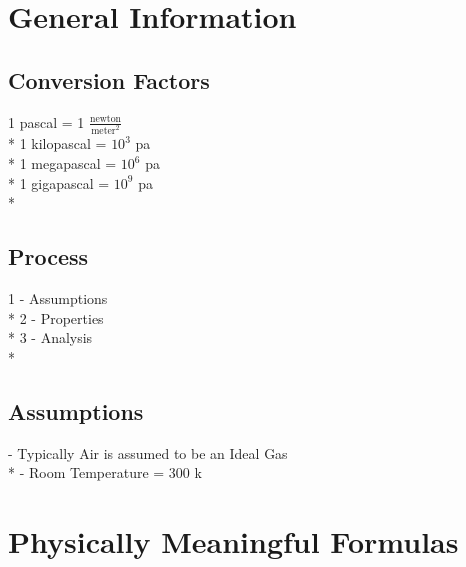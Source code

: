 \documentclass[10pt,landscape]{article}
\begin{document}
\begin{multicols}{3}

\section{General Information}
\subsection{Conversion Factors}
1 pascal        = 1 $\frac{\text{newton}}{\text{meter}^2}$\\*
1 kilopascal    = $10^3$ pa\\*
1 megapascal    = $10^6$ pa\\*
1 gigapascal    = $10^9$ pa\\*
\subsection{Process}
1 - Assumptions\\*
2 - Properties\\*
3 - Analysis\\*
\subsection{Assumptions}
- Typically Air is assumed to be an Ideal Gas\\*
- Room Temperature = 300 k

\section{Physically Meaningful Formulas}

\end{multicols}
\end{document}
